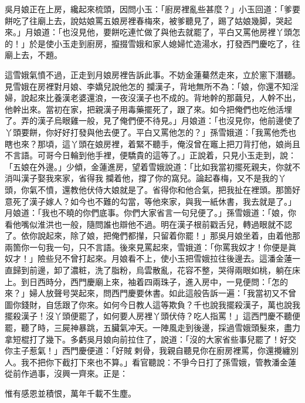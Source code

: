 吳月娘正在上房，纔起來梳頭，因問小玉：「廚房裡亂些甚麼？」小玉回道：「爹要餅吃了往廟上去，說姑娘罵五娘房裡春梅來，被爹聽見了，踢了姑娘幾脚，哭起來。」月娘道：「也沒見他，要餅吃連忙做了與他去就罷了，平白又罵他房裡丫頭怎的！」於是使小玉走到廚房，攛掇雪娥和家人媳婦忙造湯水，打發西門慶吃了，往廟上去，不題。

這雪娥氣憤不過，正走到月娘房裡告訴此事。不妨金蓮驀然走來，立於窻下潛聽。見雪娥在房裡對月娘、李嬌兒說他怎的𢺞攔漢子，背地無所不為：「娘，你還不知淫婦，說起來比養漢老婆還浪，一夜沒漢子也不成的。背地幹的那繭兒，人幹不出，他幹出來。{}當初在家，把親漢子用毒藥擺死了，跟了來。如今把俺們也吃他活埋了。弄的漢子烏眼雞一般，見了俺們便不待見。」月娘道：「也沒見你，他前邊使了丫頭要餅，你好好打發與他去便了。平白又罵他怎的？」孫雪娥道：「我罵他禿也瞎也來？那頃，這丫頭在娘房裡，着緊不聽手，俺沒曾在竈上把刀背打他，{}娘尚且不言語。可哥今日輪到他手裡，便驕貴的這等了。」正說着，只見小玉走到，說：「五娘在外邊。」{}少傾，金蓮進房，望着雪娥說道：「比如我當初擺死親夫，你就不消叫漢子娶我來家，省得我𢺞攔着他，撐了你的窩兒。{}論起春梅，又不是我的丫頭，你氣不憤，還教他伏侍大娘就是了。省得你和他合氣，把我扯在裡頭。那箇好意死了漢子嫁人？{}如今也不難的勾當，等他來家，與我一紙休書，我去就是了。」月娘道：「我也不曉的你們底事。你們大家省言一句兒便了。」孫雪娥道：「娘，你看他嘴似淮洪也一般，隨問誰也辯他不過。{}明在漢子根前戳舌兒，轉過眼就不認了。依你說起來，除了娘，把俺們都攆，只留着你罷！」那吳月娘坐着，由着他那兩箇你一句我一句，只不言語。後來見罵起來，雪娥道：「你罵我奴才！你便是眞奴才！」險些兒不曾打起來。月娘看不上，使小玉把雪娥拉往後邊去。這潘金蓮一直歸到前邊，卸了濃粧，洗了脂粉，烏雲散亂，花容不整，哭得兩眼如桃，躺在床上。{}到日西時分，西門慶廟上來，袖着四兩珠子，進入房中，一見便問：「怎的來？」婦人放聲号哭起來，問西門慶要休書。如此這般告訴一遍：「我當初又不曾圖你錢財，自恁跟了你來。如何今日教人這等欺負？千也說我擺殺漢子，萬也說我擺殺漢子！沒丫頭便罷了，如何要人房裡丫頭伏侍？吃人指罵！」這西門慶不聽便罷，聽了時，三屍神暴跳，五臟氣冲天。一陣風走到後邊，採過雪娥頭髮來，盡力{}拿短棍打了幾下。多虧吳月娘向前拉住了，說道：「沒的大家省些事兒罷了！{}好交你主子惹氣！」西門慶便道：「好賊𢱉剌骨，我親自聽見你在廚房裡罵，你還攪纏別人。我不把你下截打下來也不算。」看官聽說：不爭今日打了孫雪娥，管教潘金蓮從前作過事，沒興一齊來。正是：

\begin{myquote}
惟有感恩並積恨，萬年千載不生塵。
\end{myquote}

